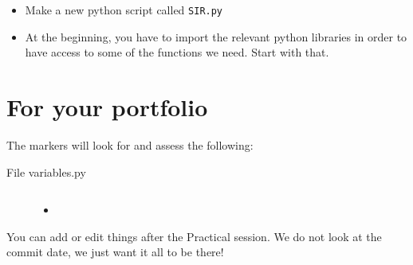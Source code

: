 \documentclass[pdflatex,a4paper]{article}
\begin{document}
\begin{itemize}
\item
Make a new python script called \verb=SIR.py=
\item
At the beginning, you have to import the relevant python libraries in order to have access to some of the functions we need. Start with that.

\begin{lstlistings}

\end{lstlistings}
\end{itemize}



\section{For your portfolio}

The markers will look for and assess the following:

\begin{description}
\item[File variables.py] $\;$\\
\begin{itemize}
\item

\end{itemize}




\end{description}



You can add or edit things after the Practical session. We do not look at the commit date, we just want it all to be there!
\end{document}
